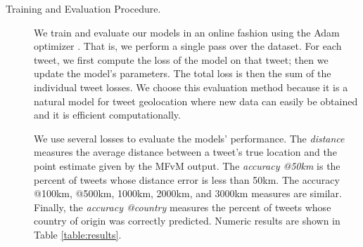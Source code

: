 \documentclass[sigconf,10pt]{acmart}
\newcommand{\defn}[1]{\textit{#1}}
\begin{document}
\begin{description}
%


\item[Training and Evaluation Procedure.]
We train and evaluate our models in an online fashion using the Adam optimizer \citep{kingma2014adam}.
That is, we perform a single pass over the dataset.
For each tweet, we first compute the loss of the model on that tweet;
then we update the model's parameters.
The total loss is then the sum of the individual tweet losses.
We choose this evaluation method because it is a natural model for tweet geolocation where new data can easily be obtained and it is efficient computationally.

We use several losses to evaluate the models' performance.
The \defn{distance} measures the average distance between a tweet's true location and the point estimate given by the MFvM output.
The \defn{accuracy @50km} is the percent of tweets whose distance error is less than 50km.
The {accuracy @100km, @500km, 1000km, 2000km, and 3000km} measures are similar.
Finally, the \defn{accuracy @country} measures the percent of tweets whose country of origin was correctly predicted.
Numeric results are shown in Table \ref{table:results}.


\end{description}
\end{document}
